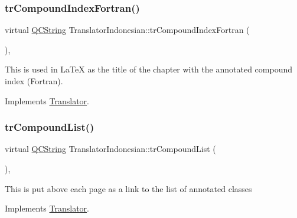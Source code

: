 \mbox{\label{class_translator_indonesian_a89ec10f8d8f07c023597713dc0cfead7}} 
\subsubsection{\texorpdfstring{trCompoundIndexFortran()}{trCompoundIndexFortran()}}
{\footnotesize\ttfamily virtual \mbox{\hyperlink{class_q_c_string}{Q\+C\+String}} Translator\+Indonesian\+::tr\+Compound\+Index\+Fortran (\begin{DoxyParamCaption}{ }\end{DoxyParamCaption})\hspace{0.3cm}{\ttfamily [inline]}, {\ttfamily [virtual]}}

This is used in La\+TeX as the title of the chapter with the annotated compound index (Fortran). 

Implements \mbox{\hyperlink{class_translator}{Translator}}.

\mbox{\label{class_translator_indonesian_afdb8480620c6d97f208e78b004e769dd}} 
\subsubsection{\texorpdfstring{trCompoundList()}{trCompoundList()}}
{\footnotesize\ttfamily virtual \mbox{\hyperlink{class_q_c_string}{Q\+C\+String}} Translator\+Indonesian\+::tr\+Compound\+List (\begin{DoxyParamCaption}{ }\end{DoxyParamCaption})\hspace{0.3cm}{\ttfamily [inline]}, {\ttfamily [virtual]}}

This is put above each page as a link to the list of annotated classes 

Implements \mbox{\hyperlink{class_translator}{Translator}}.

\mbox{\label{class_translator_indonesian_ab46aed089ae540b9ba2924eb557b9426}} 

